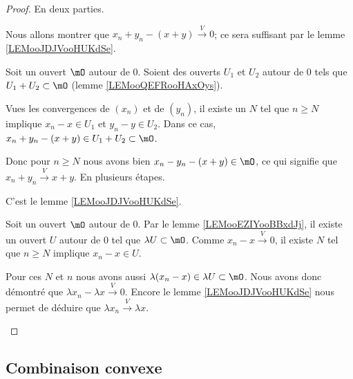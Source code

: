 \begin{proof}
	En deux parties.
	\begin{subproof}
		\spitem[\ref{ITEMooSHPAooQyEkgT}]
		Nous allons montrer que \( x_n+y_n-(x+y)\stackrel{V}{\longrightarrow}0\); ce sera suffisant par le lemme \ref{LEMooJDJVooHUKdSe}.

		Soit un ouvert \( \mO\) autour de \( 0\). Soient des ouverts \( U_1\) et \( U_2\) autour de \( 0\) tels que \( U_1+U_2\subset \mO\) (lemme \ref{LEMooQEFRooHAxOys}).

		Vues les convergences de \( (x_n)\) et de \( (y_n)\), il existe un \( N\) tel que \( n\geq N\) implique \( x_n-x\in U_1\) et \( y_n-y\in U_2\). Dans ce cas, \( x_n+y_n-(x+y)\in U_1+U_2\subset \mO\).

		Donc pour \( n\geq N\) nous avons bien \( x_n-y_n-(x+y)\in \mO\), ce qui signifie que \( x_n+y_n\stackrel{V}{\longrightarrow}x+y\).
		\spitem[\ref{ITEMooYHHYooYATzWE}]
		En plusieurs étapes.
		\begin{subproof}
			C'est le lemme \ref{LEMooJDJVooHUKdSe}.

			Soit un ouvert \( \mO\) autour de \( 0\). Par le lemme \ref{LEMooEZIYooBBxdJj}, il existe un ouvert \( U\) autour de \( 0\) tel que \( \lambda U\subset \mO\). Comme \( x_n-x\stackrel{V}{\longrightarrow}0\), il existe \( N\) tel que \( n\geq N\) implique \( x_n-x\in U\).

			Pour ces \( N\) et \( n\) nous avons aussi \( \lambda (x_n-x)\in \lambda U\subset \mO\). Nous avons donc démontré que \( \lambda x_n-\lambda x\stackrel{V}{\longrightarrow}0\).
			\spitem[Conclusion]
			Encore le lemme \ref{LEMooJDJVooHUKdSe} nous permet de déduire que \( \lambda x_n\stackrel{V}{\longrightarrow}\lambda x\).
		\end{subproof}
	\end{subproof}
\end{proof}


\subsection{Combinaison convexe}


